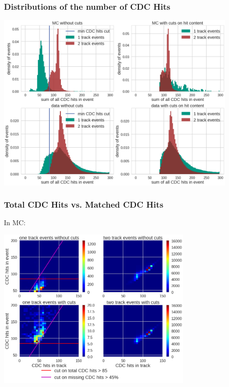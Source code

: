 \documentclass[18pt]{beamer}
\begin{document}
  \begin{frame}
    \frametitle{Distributions of the number of CDC Hits}
    \includegraphics[width=0.9\textwidth]{figures/hit_content_1dhistograms.pdf}
  \end{frame}

  \begin{frame}
    \frametitle{Total CDC Hits vs. Matched CDC Hits}
    \large In MC:\\
    \begin{center}
      \includegraphics[width=0.73\textwidth]{figures/hitcontent_2dhist_MC.png}
    \end{center}
  \end{frame}
\end{document}

